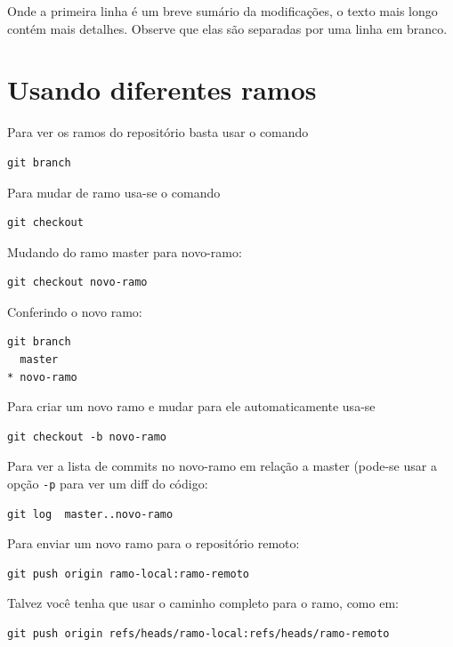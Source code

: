 \documentclass[12pt,brazil]{book}
\begin{document}
Onde a primeira linha é um breve sumário da modificações, o texto mais
longo contém mais detalhes. Observe que elas são separadas por uma
linha em branco.

\section{Usando diferentes ramos}
\label{sec:usando-o-git}

Para ver os ramos do repositório basta usar o comando

\begin{verbatim}
git branch
\end{verbatim}

Para mudar de ramo usa-se o comando

\begin{verbatim}
git checkout
\end{verbatim}

Mudando do ramo master para novo-ramo:

\begin{verbatim}
git checkout novo-ramo
\end{verbatim}

Conferindo o novo ramo:

\begin{verbatim}
git branch
  master
* novo-ramo
\end{verbatim}

Para criar um novo ramo e mudar para ele automaticamente usa-se

\begin{verbatim}
git checkout -b novo-ramo
\end{verbatim}

Para ver a lista de commits no novo-ramo em relação a master (pode-se
usar a opção \texttt{-p} para ver um diff do código:

\begin{verbatim}
git log  master..novo-ramo
\end{verbatim}

Para enviar um novo ramo para o repositório remoto:

\begin{verbatim}
git push origin ramo-local:ramo-remoto
\end{verbatim}

Talvez você tenha que usar o caminho completo para o ramo, como em:

\begin{verbatim}
git push origin refs/heads/ramo-local:refs/heads/ramo-remoto
\end{verbatim}
\end{document}
